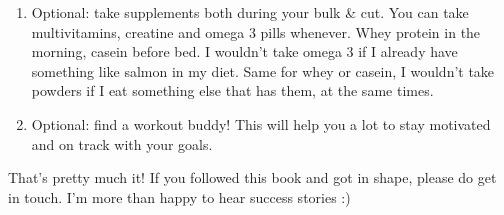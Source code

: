 \documentclass[openany, 12pt]{book}
\begin{document}
\begin{enumerate}
                \item Optional: take supplements both during your bulk \& cut. You can take multivitamins, creatine and omega 3 pills whenever. Whey protein in the morning, casein before bed. I wouldn't
                  take omega 3 if I already have something like salmon in my diet. Same for whey or casein, I wouldn't take powders if I eat something else that has them, at the same times.
                \item Optional: find a workout buddy! This will help you a lot to stay motivated and on track with your goals.
        \end{enumerate}

        That's pretty much it! If you followed this book and got in shape, please do get in touch. I'm more than happy to hear success stories :)
\end{document}
